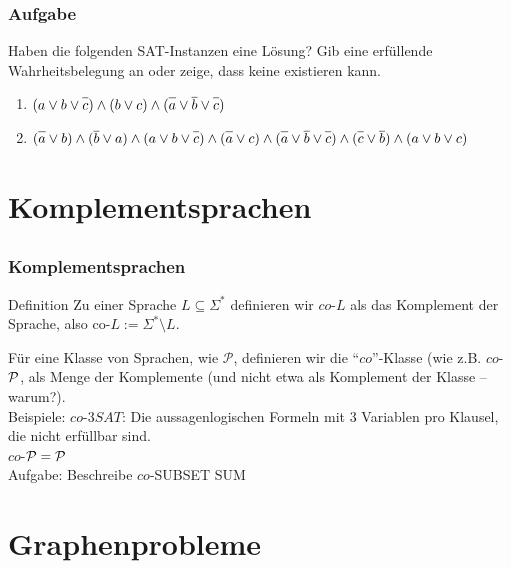 \begin{frame}
	\frametitle{Aufgabe}
	
	Haben die folgenden SAT-Instanzen eine Lösung? Gib eine erfüllende Wahrheitsbelegung an oder zeige, dass keine existieren kann.
\begin{enumerate}
 \item $(a \vee b \vee \neglit{c}) \wedge (b \vee c) \wedge  (\neglit{a} \vee \neglit{b} \vee \neglit{c})$
 \item $(\neglit{a} \vee b) \wedge (\neglit{b} \vee  a) \wedge (a \vee b \vee \neglit{c}) \wedge (\neglit{a} \vee c)  \wedge  (\neglit{a} \vee \neglit{b} \vee \neglit{c}) \wedge (\neglit{c} \vee \neglit{b}) \wedge (a \vee b \vee c)$
\end{enumerate}
\end{frame}

\section{Komplementsprachen}
\subsection{}

\begin{frame}
\frametitle{Komplementsprachen}
\begin{block}{Definition}
Zu einer Sprache $L \subseteq \Sigma^*$ definieren wir $co$-$L$ als das Komplement der Sprache, also
$\mbox{co-}L := \Sigma^*\setminus L$.
\end{block}
Für eine Klasse von Sprachen, wie $\mathcal{P}$, definieren wir die "`$co$"'-Klasse (wie z.B. $co$-$\mathcal{P}$, als Menge der Komplemente (und nicht etwa als Komplement der Klasse -- warum?).\\[8pt]
Beispiele: $co$-$3SAT$: Die aussagenlogischen Formeln mit 3 Variablen pro Klausel, die nicht erfüllbar sind.\\
$co$-$\mathcal{P} = \mathcal{P}$\\[8pt]
Aufgabe: Beschreibe $co$-SUBSET SUM
\end{frame}

\section{Graphenprobleme}
\subsection{}


